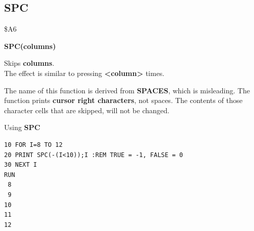 \subsection{SPC}
\begin{description}[leftmargin=2cm,style=nextline]
\item [Token:] \$A6
\item [Format:] {\bf SPC(columns)}
\item [Usage:] Skips {\bf columns}. \\
               The effect is similar to pressing \megakey{$\rightarrow$}
               {\bf <column>} times.

\item [Remarks:] The name of this function is derived from
                 {\bf SPACES}, which is misleading.
                 The function prints {\bf cursor right characters},
                 not spaces. The contents of those character
                 cells that are skipped, will not be changed.

\item [Example:] Using {\bf SPC}
\begin{tcolorbox}[colback=black,coltext=white]
\verbatimfont{\codefont}
\begin{verbatim}
10 FOR I=8 TO 12
20 PRINT SPC(-(I<10));I :REM TRUE = -1, FALSE = 0
30 NEXT I
RUN
 8
 9
10
11
12
\end{verbatim}
\end{tcolorbox}
\end{description}


\newpage
